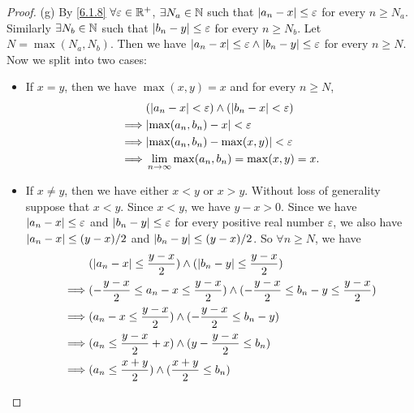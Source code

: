 \begin{proof}{(g)}
  By \cref{6.1.8} \(\forall \varepsilon \in \mathbb{R}^+\), \(\exists N_a \in \mathbb{N}\) such that \(\left\lvert a_n - x\right\rvert \leq \varepsilon\) for every \(n \geq N_a\).
  Similarly \(\exists N_b \in \mathbb{N}\) such that \(\left\lvert b_n - y\right\rvert \leq \varepsilon\) for every \(n \geq N_b\).
  Let \(N = \max(N_a, N_b)\).
  Then we have \(\left\lvert a_n - x\right\rvert \leq \varepsilon \land \left\lvert b_n - y\right\rvert \leq \varepsilon\) for every \(n \geq N\).
  Now we split into two cases:
  \begin{itemize}
    \item If \(x = y\), then we have \(\max(x, y) = x\) and for every \(n \geq N\),
          \begin{align*}
                     & (\abs{a_n - x} < \varepsilon) \land (\abs{b_n - x} < \varepsilon) \\
            \implies & \abs{\max(a_n, b_n) - x} < \varepsilon                            \\
            \implies & \abs{\max(a_n, b_n) - \max(x, y)} < \varepsilon                   \\
            \implies & \lim_{n \to \infty} \max(a_n, b_n) = \max(x, y) = x.
          \end{align*}
    \item If \(x \neq y\), then we have either \(x < y\) or \(x > y\).
          Without loss of generality suppose that \(x < y\).
          Since \(x < y\), we have \(y - x > 0\).
          Since we have \(\left\lvert a_n - x\right\rvert \leq \varepsilon\) and \(\left\lvert b_n - y\right\rvert \leq \varepsilon\) for every positive real number \(\varepsilon\), we also have \(\left\lvert a_n - x\right\rvert \leq (y - x) / 2\) and \(\left\lvert b_n - y\right\rvert \leq (y - x) / 2\).
          So \(\forall n \geq N\), we have
          \begin{align*}
                     & (\abs{a_n - x} \leq \dfrac{y - x}{2}) \land (\abs{b_n - y} \leq \dfrac{y - x}{2})                                   \\
            \implies & (-\dfrac{y - x}{2} \leq a_n - x \leq \dfrac{y - x}{2}) \land (-\dfrac{y - x}{2} \leq b_n - y \leq \dfrac{y - x}{2}) \\
            \implies & (a_n - x \leq \dfrac{y - x}{2}) \land (-\dfrac{y - x}{2} \leq b_n - y)                                              \\
            \implies & (a_n \leq \dfrac{y - x}{2} + x) \land (y - \dfrac{y - x}{2} \leq b_n)                                               \\
            \implies & (a_n \leq \dfrac{x + y}{2}) \land (\dfrac{x + y}{2} \leq b_n)                                                       \\

\end{align*}
\end{itemize}
\end{proof}
